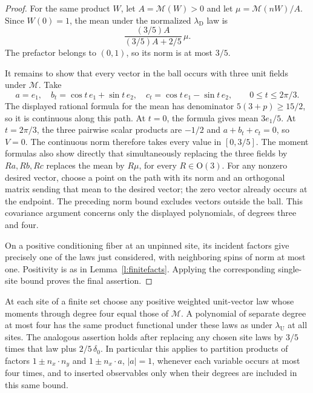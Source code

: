 \begin{proof}
For the same product \(W\), let \(A=\mathcal M(W)>0\) and let
\(\mu=\mathcal M(nW)/A\). Since \(W(0)=1\), the mean under the
normalized \(\lambda_{\mathrm D}\) law is
\[
 \frac{(3/5)A}{(3/5)A+2/5}\,\mu.
\]
The prefactor belongs to \((0,1)\), so its norm is at most \(3/5\).

It remains to show that every vector in the ball occurs with three
unit fields under \(\mathcal M\). Take
\[
 a=e_1,\quad b_t=\cos t\,e_1+\sin t\,e_2,\quad
 c_t=\cos t\,e_1-\sin t\,e_2,\qquad 0\le t\le2\pi/3.
\]
The displayed rational formula for the mean has denominator
\(5(3+p)\ge15/2\), so it is continuous along this path.
At \(t=0\), the formula gives mean \(3e_1/5\).
At \(t=2\pi/3\), the three pairwise scalar products are \(-1/2\)
and \(a+b_t+c_t=0\), so \(V=0\).
The continuous norm therefore takes every value in \([0,3/5]\).
The moment formulas also show directly that simultaneously replacing
the three fields by \(Ra,Rb,Rc\) replaces the mean by \(R\mu\),
for every \(R\in\mathrm O(3)\).
For any nonzero desired vector, choose a point on the path with
its norm and an orthogonal matrix sending that mean to the desired
vector; the zero vector already occurs at the endpoint.
The preceding norm bound excludes vectors outside the ball.
This covariance argument concerns only the displayed polynomials,
of degrees three and four.

On a positive conditioning fiber at an unpinned site, its incident
factors give precisely one of the laws just considered, with
neighboring spins of norm at most one. Positivity is as in
Lemma~\ref{l:finitefacts}. Applying the corresponding single-site
bound proves the final assertion.
\end{proof}

\begin{lemma}\label{l:exact}
At each site of a finite set choose any positive weighted unit-vector
law whose moments through degree four equal those of \(\mathcal M\).
A polynomial of separate degree at most four has the same product
functional under these laws as under \(\lambda_{\mathrm U}\) at all
sites. The analogous assertion holds after replacing any chosen site
laws by \(3/5\) times that law plus \(2/5\,\delta_0\).
In particular this applies to partition products of factors
\(1\pm n_x\cdot n_y\) and \(1\pm n_x\cdot a\), \(|a|=1\), whenever
each variable occurs at most four times, and to inserted observables
only when their degrees are included in this same bound.
\end{lemma}


